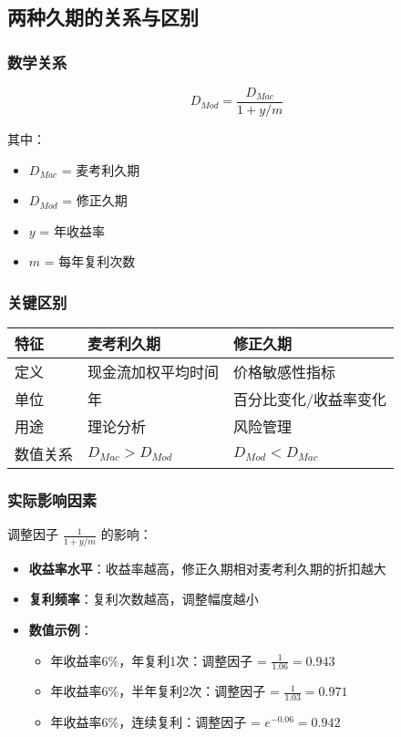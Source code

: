 \subsection{两种久期的关系与区别}

\subsubsection{数学关系}

\begin{equation}
D_{Mod} = \frac{D_{Mac}}{1 + y/m}
\end{equation}

\noindent 其中：
\begin{itemize}
    \item $D_{Mac}$ = 麦考利久期
    \item $D_{Mod}$ = 修正久期
    \item $y$ = 年收益率
    \item $m$ = 每年复利次数
\end{itemize}

\subsubsection{关键区别}

\begin{table}[h]
\centering
\begin{tabular}{|l|l|l|}
\hline
\textbf{特征} & \textbf{麦考利久期} & \textbf{修正久期} \\
\hline
定义 & 现金流加权平均时间 & 价格敏感性指标 \\
\hline
单位 & 年 & 百分比变化/收益率变化 \\
\hline
用途 & 理论分析 & 风险管理 \\
\hline
数值关系 & $D_{Mac} > D_{Mod}$ & $D_{Mod} < D_{Mac}$ \\
\hline
\end{tabular}
\end{table}

\subsubsection{实际影响因素}

调整因子 $\frac{1}{1 + y/m}$ 的影响：

\begin{itemize}
    \item \textbf{收益率水平}：收益率越高，修正久期相对麦考利久期的折扣越大
    \item \textbf{复利频率}：复利次数越高，调整幅度越小
    \item \textbf{数值示例}：
    \begin{itemize}
        \item 年收益率6\%，年复利1次：调整因子 = $\frac{1}{1.06} = 0.943$
        \item 年收益率6\%，半年复利2次：调整因子 = $\frac{1}{1.03} = 0.971$
        \item 年收益率6\%，连续复利：调整因子 = $e^{-0.06} = 0.942$
    \end{itemize}
\end{itemize}

